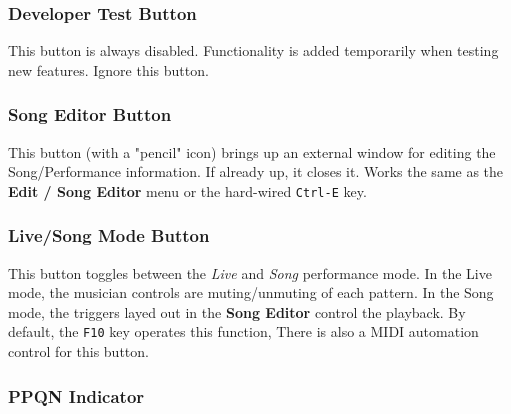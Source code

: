 \subsubsection{Developer Test Button}
\label{subsubsec:introduction_developer_test_button}

   This button is always disabled.  Functionality is added temporarily when
   testing new features. Ignore this button.

\subsubsection{Song Editor Button}
\label{subsubsec:introduction_song_editor_button}

   This button (with a "pencil" icon)
   brings up an external window for editing the Song/Performance
   information.  If already up, it closes it.  Works the same as the
   \textbf{Edit / Song Editor} menu or the hard-wired \texttt{Ctrl-E} key.

\subsubsection{Live/Song Mode Button}
\label{subsubsec:introduction_livesong_mode_button}

   This button toggles between the \textsl{Live} and \textsl{Song} performance
   mode. In the Live mode, the musician controls are muting/unmuting of each
   pattern.  In the Song mode, the triggers layed out in the
   \textbf{Song Editor} control the playback.
   By default, the \texttt{F10} key operates this function,
   There is also a MIDI automation control for this button.

\begin{comment}
   \itempar{Toggle Tracks}{pattern!toggle tracks}
   \index{pattern!toggle tracks}
   This button changes the status of all of the
   \textsl{playing} tracks, reversing the
   mute status of each pattern that is playing.
   The next click will then unmute only those tracks.
   Because it can be confusing, this button is disabled (not shown
   in the figure) in Song mode.

   LATER:  Describe
   \texttt{Ctrl-M},
   \texttt{Ctrl-U}, and
   \texttt{Ctrl-T}.

\end{comment}

\subsubsection{PPQN Indicator}
\label{subsubsec:introduction_ppqn_indicator}

